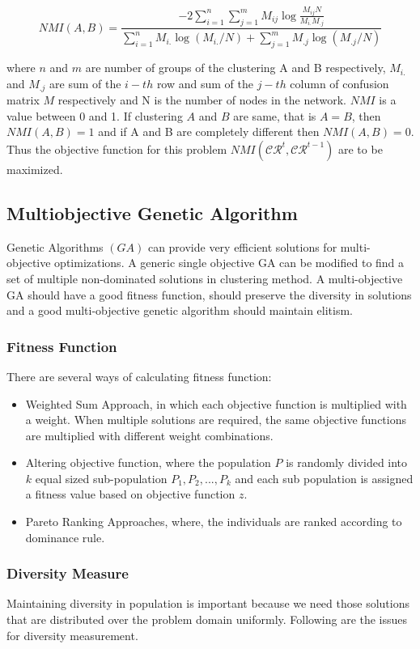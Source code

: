 \documentclass[12pt]{arsubmit}
\begin{document}
\begin{equation} NMI(A,B) =\frac{ -2 \sum\limits_{i=1}^n\sum\limits_{j=1}^m M_{ij}\log {\frac {M_{ij}N}{M_{i.}M_{.j}}} }{\sum\limits_{i=1}^nM_{i.}\log{(M_{i.}/N)} + \sum\limits_{j=1}^mM_{.j}\log{(M_{.j}/N)}}\label{eq:four}
\end{equation} 

where $n$ and $m$ are number of groups of the clustering A and B respectively, $M_{i.}$ and $M_{.j}$ are sum of the $i-th$ row and sum of the $j-th$ column of confusion matrix $M$ respectively and N is the number of nodes in the network. $NMI$ is a value between 0 and 1. If clustering $A$ and $B$ are same, that is $A = B$, then $NMI(A,B)=1$ and if A and B are completely different then $NMI(A,B) =0$. Thus the objective function for this problem $NMI(\mathcal{CR}^t,\mathcal{CR}^{t-1})$ are to be maximized.


\subsection{Multiobjective Genetic Algorithm}
Genetic Algorithms $(GA)$ can provide very efficient solutions for multi-objective optimizations. A generic single objective GA can be modified to find a set of multiple non-dominated solutions in clustering method. A multi-objective GA should have a good fitness function, should preserve the diversity in solutions and a good multi-objective genetic algorithm should maintain elitism. 

\subsubsection{Fitness Function}
There are several ways of calculating fitness function:
\begin{itemize}
\item Weighted Sum Approach, in which each objective function is multiplied with a weight. When multiple solutions are required, the same objective functions are multiplied with different weight combinations.
\item Altering objective function, where the population $P$ is randomly divided into $k$ equal sized sub-population $P_1, P_2,..., P_k$ and each sub population is assigned a fitness value based on objective function $z$. 
\item Pareto Ranking Approaches, where, the individuals are ranked according to dominance rule. 
\end{itemize}

\subsubsection {Diversity Measure}
Maintaining diversity in population is important because we need those solutions that are distributed over the problem domain uniformly. Following are the issues for diversity measurement.
\end{document}
